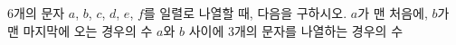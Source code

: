 $6$개의 문자 $a$, $b$, $c$, $d$, $e$, $f$를 일렬로 나열할 때, 다음을 구하시오.
 $a$가 맨 처음에, $b$가 맨 마지막에 오는 경우의 수
 $a$와 $b$ 사이에 $3$개의 문자를 나열하는 경우의 수
